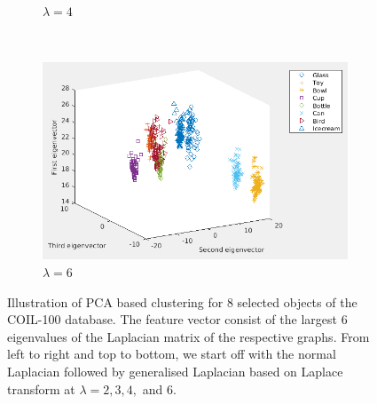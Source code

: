 \documentclass[10pt,a4paper]{article}
\begin{document}
\begin{figure}[H]
\begin{subfigure}[b]{0.45\textwidth}
		\caption{$\lambda=4$}
		\label{}
	\end{subfigure}~
	\begin{subfigure}[b]{0.45\textwidth}
		\includegraphics[width= \textwidth]{images/Laplace-lam6.png}
		\caption{$\lambda=6$}
		\label{}
	\end{subfigure}
	\caption{Illustration of PCA based clustering for $8$ selected objects of the COIL-100 database. The feature vector consist of the largest $6$ eigenvalues of the Laplacian matrix of the respective graphs. From left to right and top to bottom, we start off with the normal Laplacian followed by generalised Laplacian based on Laplace transform at $\lambda =2,3,4,$ and $6$. }
	\label{}
\end{figure}


\newpage
\renewcommand{\bibname}{References}
\nocite{*}


\end{document}
